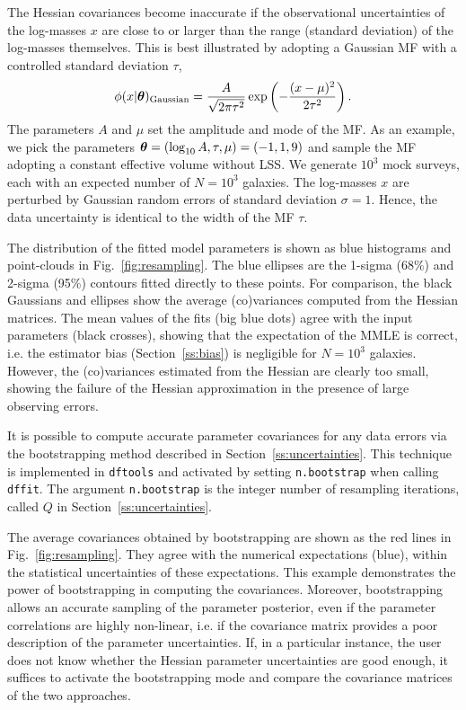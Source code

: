 \documentclass[a4paper,fleqn,usenatbib]{mnras}
\newcommand{\be}{\begin{equation}}
\newcommand{\ee}{\end{equation}}
\newcommand{\dftools}{\texttt{dftools}\xspace}
\newcommand{\fig}[1]{Fig.~\ref{fig:#1}}
\renewcommand{\ss}[1]{Section~\ref{ss:#1}}
\newcommand{\ie}{i.e.\xspace}
\newcommand{\para}{{\bm{\theta}}}
\begin{document}
The Hessian covariances become inaccurate if the observational uncertainties of the log-masses $x$ are close to or larger than the range (standard deviation) of the log-masses themselves. This is best illustrated by adopting a Gaussian MF with a controlled standard deviation $\tau$,
%
\be\label{eq:gauss}
	\phi(x|\para)_{\rm Gaussian} = \frac{A}{\sqrt{2\pi\tau^2}}\exp\left(-\frac{(x-\mu)^2}{2\tau^2}\right).
\ee
%
The parameters $A$ and $\mu$ set the amplitude and mode of the MF. As an example, we pick the parameters $\para=(\log_{\rm10}A,\tau,\mu)=(-1,1,9)$ and sample the MF adopting a constant effective volume without LSS. We generate $10^3$ mock surveys, each with an expected number of $N=10^3$ galaxies. The log-masses $x$ are perturbed by Gaussian random errors of standard deviation $\sigma=1$. Hence, the data uncertainty is identical to the width of the MF $\tau$.

The distribution of the fitted model parameters is shown as blue histograms and point-clouds in \fig{resampling}. The blue ellipses are the 1-sigma (68\%) and 2-sigma (95\%) contours fitted directly to these points. For comparison, the black Gaussians and ellipses show the average (co)variances computed from the Hessian matrices. The mean values of the fits (big blue dots) agree with the input parameters (black crosses), showing that the expectation of the MMLE is correct, \ie the estimator bias (\ss{bias}) is negligible for $N=10^3$ galaxies. However, the (co)variances estimated from the Hessian are clearly too small, showing the failure of the Hessian approximation in the presence of large observing errors.

It is possible to compute accurate parameter covariances for any data errors via the bootstrapping method described in \ss{uncertainties}. This technique is implemented in \dftools and activated by setting \texttt{n.bootstrap} when calling \texttt{dffit}. The argument \texttt{n.bootstrap} is the integer number of resampling iterations, called $Q$ in \ss{uncertainties}.

The average covariances obtained by bootstrapping are shown as the red lines in \fig{resampling}. They agree with the numerical expectations (blue), within the statistical uncertainties of these expectations. This example demonstrates the power of bootstrapping in computing the covariances. Moreover, bootstrapping allows an accurate sampling of the parameter posterior, even if the parameter correlations are highly non-linear, \ie if the covariance matrix provides a poor description of the parameter uncertainties. If, in a particular instance, the user does not know whether the Hessian parameter uncertainties are good enough, it suffices to activate the bootstrapping mode and compare the covariance matrices of the two approaches.
\end{document}
